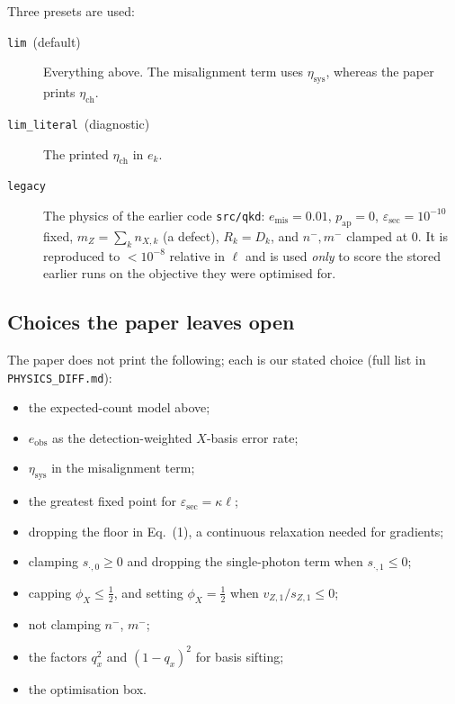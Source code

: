 \documentclass[11pt,a4paper]{article}
\newcommand{\plim}{\texttt{lim}}
\newcommand{\limlit}{\texttt{lim\_literal}}
\newcommand{\legacy}{\texttt{legacy}}
\newcommand{\esec}{\varepsilon_{\mathrm{sec}}}
\begin{document}
Three presets are used:
\begin{description}
\item[\plim\ (default)] Everything above. The misalignment term uses $\eta_{\mathrm{sys}}$, whereas the paper
  prints $\eta_{\mathrm{ch}}$.
\item[\limlit\ (diagnostic)] The printed $\eta_{\mathrm{ch}}$ in $e_k$.
\item[\legacy] The physics of the earlier code \texttt{src/qkd}: $e_{\mathrm{mis}}=0.01$, $p_{\mathrm{ap}}=0$,
  $\esec=10^{-10}$ fixed, $m_Z=\sum_k n_{X,k}$ (a defect), $R_k=D_k$, and $n^-,m^-$ clamped at 0. It is
  reproduced to $<10^{-8}$ relative in $\ell$ and is used \emph{only} to score the stored earlier runs on the
  objective they were optimised for.
\end{description}

\subsection{Choices the paper leaves open}\label{sec:choices}
The paper does not print the following; each is our stated choice (full list in \texttt{PHYSICS\_DIFF.md}):
\begin{itemize}
\item the expected-count model above;
\item $e_{\mathrm{obs}}$ as the detection-weighted $X$-basis error rate;
\item $\eta_{\mathrm{sys}}$ in the misalignment term;
\item the greatest fixed point for $\esec=\kappa\ell$;
\item dropping the floor in Eq.~(1), a continuous relaxation needed for gradients;
\item clamping $s_{\cdot,0}\ge0$ and dropping the single-photon term when $s_{\cdot,1}\le0$;
\item capping $\phi_X\le\tfrac12$, and setting $\phi_X=\tfrac12$ when $v_{Z,1}/s_{Z,1}\le0$;
\item not clamping $n^-$, $m^-$;
\item the factors $q_x^2$ and $(1-q_x)^2$ for basis sifting;
\item the optimisation box.
\end{itemize}

\end{document}
